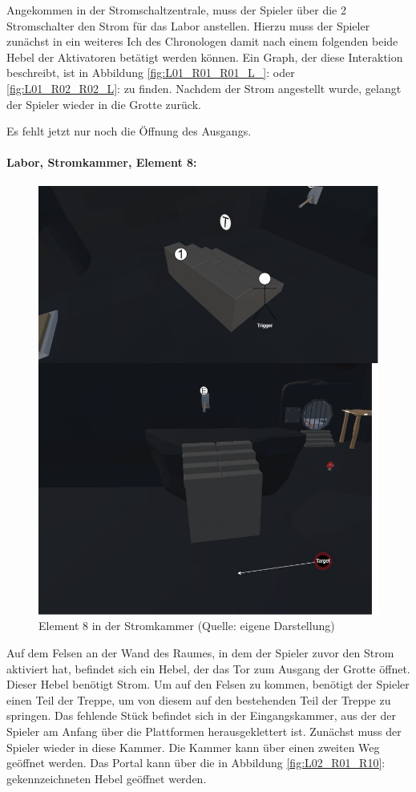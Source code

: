 Angekommen in der Stromschaltzentrale, muss der Spieler über die 2 Stromschalter den Strom für das Labor anstellen. Hierzu muss der Spieler zunächst in ein weiteres Ich des Chronologen  damit nach einem folgenden  beide Hebel der Aktivatoren betätigt werden können. Ein Graph, der diese Interaktion beschreibt, ist in Abbildung \ref{fig:L01_R01_R01_L_}:  oder \ref{fig:L01_R02_R02_L}:  zu finden. Nachdem der Strom angestellt wurde, gelangt der Spieler wieder in die Grotte zurück.

Es fehlt jetzt nur noch die Öffnung des Ausgangs.

\paragraph{Labor, Stromkammer, Element 8:}\label{p:lse8}

\begin{figure}[ht]
\centering
\includegraphics[width=0.8\linewidth]{content/pictures/Raetsel-L02_R01_R08.jpg}
\caption{Element 8 in der Stromkammer (Quelle: eigene Darstellung)}
\label{fig:L02_R01_R08}
\end{figure}

Auf dem Felsen an der Wand des Raumes, in dem der Spieler zuvor den Strom aktiviert hat, befindet sich ein Hebel, der das Tor zum Ausgang der Grotte öffnet. Dieser Hebel benötigt Strom. Um auf den Felsen zu kommen, benötigt der Spieler einen Teil der Treppe, um von diesem auf den bestehenden Teil der Treppe zu springen. Das fehlende Stück befindet sich in der Eingangskammer, aus der der Spieler am Anfang über die Plattformen herausgeklettert ist. Zunächst muss der Spieler wieder in diese Kammer. Die Kammer kann über einen zweiten Weg geöffnet werden. Das Portal kann über die in Abbildung \ref{fig:L02_R01_R10}:  gekennzeichneten Hebel geöffnet werden.

